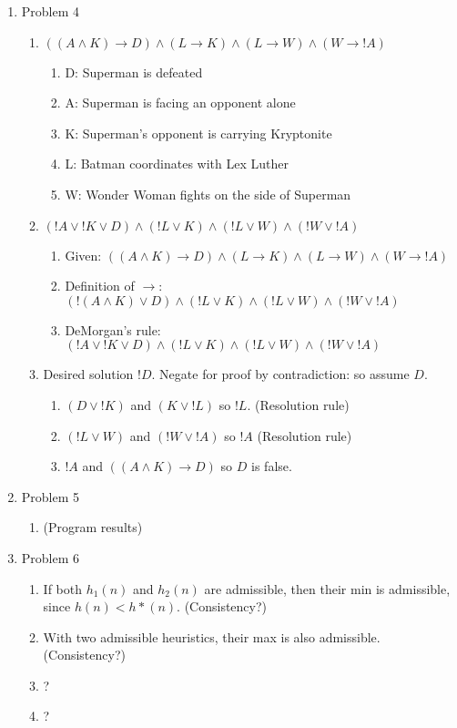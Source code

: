 \documentclass[11pt]{article}
\begin{document}
\begin{enumerate}
\item Problem 4
\begin{enumerate}
\item $((A \land K) \to D) \land (L \to K) \land (L \to W) \land (W \to !A)$
\begin{enumerate}
\item D: Superman is defeated
\item A: Superman is facing an opponent alone
\item K: Superman's opponent is carrying Kryptonite
\item L: Batman coordinates with Lex Luther
\item W: Wonder Woman fights on the side of Superman
\end{enumerate}
\item $(!A \lor !K \lor D) \land (!L \lor K) \land (!L \lor W) \land (!W \lor !A)$
\begin{enumerate}
\item Given: $((A \land K) \to D) \land (L \to K) \land (L \to W) \land (W \to !A)$
\item Definition of $\to$: $(!(A \land K) \lor D) \land (!L \lor K) \land (!L \lor W) \land (!W \lor !A)$
\item DeMorgan's rule: $(!A \lor !K \lor D) \land (!L \lor K) \land (!L \lor W) \land (!W \lor !A)$
\end{enumerate}
\item Desired solution $!D$. Negate for proof by contradiction: so assume $D$.
\begin{enumerate}
\item $(D \lor !K)$ and $(K \lor !L)$ so $!L$. (Resolution rule)
\item $(!L \lor W)$ and $(!W \lor !A)$ so $!A$ (Resolution rule)
\item $!A$ and $((A \land K) \to D)$ so $D$ is false.
\end{enumerate}
\end{enumerate}

\item Problem 5
\begin{enumerate}
\item (Program results)
\end{enumerate}

\item Problem 6
\begin{enumerate}
\item If both $h_{1}(n)$ and $h_2(n)$ are admissible, then their min is admissible, since $h(n) < h*(n)$. (Consistency?)
\item With two admissible heuristics, their max is also admissible. (Consistency?)
\item ?
\item ?
\end{enumerate}


\end{enumerate}
\end{document}
